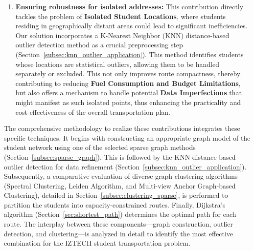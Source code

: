 \begin{enumerate}
    \item \textbf{Ensuring robustness for isolated addresses:} This contribution directly tackles the problem of \textbf{Isolated Student Locations}, where students residing in geographically distant areas could lead to significant inefficiencies. Our solution incorporates a K-Nearest Neighbor (KNN) distance-based outlier detection method as a crucial preprocessing step (Section~\ref{subsec:knn_outlier_application}). This method identifies students whose locations are statistical outliers, allowing them to be handled separately or excluded. This not only improves route compactness, thereby contributing to reducing \textbf{Fuel Consumption and Budget Limitations}, but also offers a mechanism to handle potential \textbf{Data Imperfections} that might manifest as such isolated points, thus enhancing the practicality and cost-effectiveness of the overall transportation plan.
\end{enumerate}

The comprehensive methodology to realize these contributions integrates these specific techniques. It begins with constructing an appropriate graph model of the student network using one of the selected sparse graph methods (Section~\ref{subsec:sparse_graph}). This is followed by the KNN distance-based outlier detection for data refinement (Section~\ref{subsec:knn_outlier_application}). Subsequently, a comparative evaluation of diverse graph clustering algorithms (Spectral Clustering, Leiden Algorithm, and Multi-view Anchor Graph-based Clustering), detailed in Section~\ref{subsec:clustering_sparse}, is performed to partition the students into capacity-constrained routes. Finally, Dijkstra's algorithm (Section~\ref{sec:shortest_path}) determines the optimal path for each route. The interplay between these components—graph construction, outlier detection, and clustering—is analyzed in detail to identify the most effective combination for the IZTECH student transportation problem.

